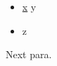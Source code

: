 \documentclass{article}
\begin{document}
\begin{itemize}\item \ul{x} y\item z\end{itemize}
Next para.
\end{document}
